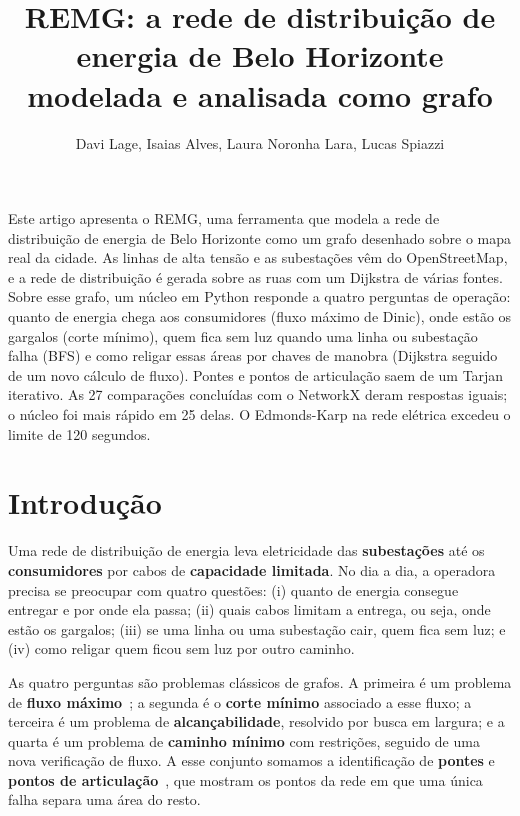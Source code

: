 \documentclass[12pt]{article}
\title{REMG: a rede de distribuição de energia de Belo Horizonte\\ modelada e analisada como grafo}
\author{Davi Lage\inst{1}, Isaias Alves\inst{1}, Laura Noronha Lara\inst{1}, Lucas Spiazzi\inst{1}}
\begin{document}
\maketitle

\begin{resumo}
Este artigo apresenta o REMG, uma ferramenta que modela a rede de distribuição de energia de Belo Horizonte como um grafo desenhado sobre o mapa real da cidade. As linhas de alta tensão e as subestações vêm do OpenStreetMap, e a rede de distribuição é gerada sobre as ruas com um Dijkstra de várias fontes. Sobre esse grafo, um núcleo em Python responde a quatro perguntas de operação: quanto de energia chega aos consumidores (fluxo máximo de Dinic), onde estão os gargalos (corte mínimo), quem fica sem luz quando uma linha ou subestação falha (BFS) e como religar essas áreas por chaves de manobra (Dijkstra seguido de um novo cálculo de fluxo). Pontes e pontos de articulação saem de um Tarjan iterativo. As 27 comparações concluídas com o NetworkX deram respostas iguais; o núcleo foi mais rápido em 25 delas. O Edmonds-Karp na rede elétrica excedeu o limite de 120 segundos.
\end{resumo}

\section{Introdução}

Uma rede de distribuição de energia leva eletricidade das \textbf{subestações} até os \textbf{consumidores} por cabos de \textbf{capacidade limitada}. No dia a dia, a operadora precisa se preocupar com quatro questões: (i) quanto de energia consegue entregar e por onde ela passa; (ii) quais cabos limitam a entrega, ou seja, onde estão os gargalos; (iii) se uma linha ou uma subestação cair, quem fica sem luz; e (iv) como religar quem ficou sem luz por outro caminho.

As quatro perguntas são problemas clássicos de grafos. A primeira é um problema de \textbf{fluxo máximo}~\cite{ford1956}; a segunda é o \textbf{corte mínimo} associado a esse fluxo; a terceira é um problema de \textbf{alcançabilidade}, resolvido por busca em largura; e a quarta é um problema de \textbf{caminho mínimo} com restrições, seguido de uma nova verificação de fluxo. A esse conjunto somamos a identificação de \textbf{pontes} e \textbf{pontos de articulação}~\cite{tarjan1972}, que mostram os pontos da rede em que uma única falha separa uma área do resto.
\end{document}
